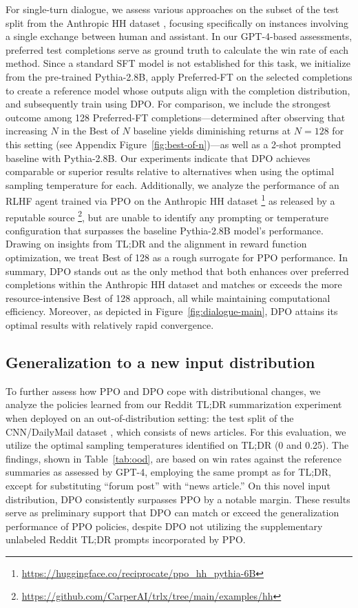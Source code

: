 For single-turn dialogue, we assess various approaches on the subset of the test split from the Anthropic HH dataset \citep{bai2022training}, focusing specifically on instances involving a single exchange between human and assistant. In our GPT-4-based assessments, preferred test completions serve as ground truth to calculate the win rate of each method. Since a standard SFT model is not established for this task, we initialize from the pre-trained Pythia-2.8B, apply Preferred-FT on the selected completions to create a reference model whose outputs align with the completion distribution, and subsequently train using DPO. For comparison, we include the strongest outcome among 128 Preferred-FT completions—determined after observing that increasing $N$ in the Best of $N$ baseline yields diminishing returns at $N=128$ for this setting (see Appendix Figure~\ref{fig:best-of-n})—as well as a 2-shot prompted baseline with Pythia-2.8B. Our experiments indicate that DPO achieves comparable or superior results relative to alternatives when using the optimal sampling temperature for each. Additionally, we analyze the performance of an RLHF agent trained via PPO on the Anthropic HH dataset \footnote{\url{https://huggingface.co/reciprocate/ppo_hh_pythia-6B}} as released by a reputable source \footnote{\url{https://github.com/CarperAI/trlx/tree/main/examples/hh}}, but are unable to identify any prompting or temperature configuration that surpasses the baseline Pythia-2.8B model’s performance. Drawing on insights from TL;DR and the alignment in reward function optimization, we treat Best of 128 as a rough surrogate for PPO performance. In summary, DPO stands out as the only method that both enhances over preferred completions within the Anthropic HH dataset and matches or exceeds the more resource-intensive Best of 128 approach, all while maintaining computational efficiency. Moreover, as depicted in Figure~\ref{fig:dialogue-main}, DPO attains its optimal results with relatively rapid convergence.

\subsection{Generalization to a new input distribution}

To further assess how PPO and DPO cope with distributional changes, we analyze the policies learned from our Reddit TL;DR summarization experiment when deployed on an out-of-distribution setting: the test split of the CNN/DailyMail dataset \citep{nallapati-etal-2016-abstractive}, which consists of news articles. For this evaluation, we utilize the optimal sampling temperatures identified on TL;DR (0 and 0.25). The findings, shown in Table~\ref{tab:ood}, are based on win rates against the reference summaries as assessed by GPT-4, employing the same prompt as for TL;DR, except for substituting “forum post” with “news article.” On this novel input distribution, DPO consistently surpasses PPO by a notable margin. These results serve as preliminary support that DPO can match or exceed the generalization performance of PPO policies, despite DPO not utilizing the supplementary unlabeled Reddit TL;DR prompts incorporated by PPO.

